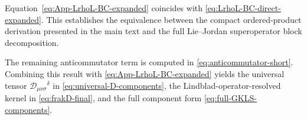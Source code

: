 \documentclass[notitlepage,aip,reprint,onecolumn]{revtex4-1}
\theoremstyle{definition}
\begin{document}
Equation~\eqref{eq:App-LrhoL-BC-expanded} coincides with \eqref{eq:LrhoL-BC-direct-expanded}. This establishes the equivalence between the compact ordered-product derivation presented in the main text and the full Lie–Jordan superoperator block decomposition.

The remaining anticommutator term is computed in \eqref{eq:anticommutator-short}. Combining this result with \eqref{eq:App-LrhoL-BC-expanded} yields the universal tensor
\(\mathcal D_{\mu\nu\sigma}{}^\delta\) in \eqref{eq:universal-D-components}, the Lindblad-operator-resolved kernel in \eqref{eq:frakD-final}, and the full component form
\eqref{eq:full-GKLS-components}.



\end{document}

